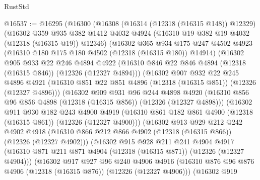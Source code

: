 \begin{lexlean}{RustStd}
\begin{coremodule}
@16537 := @16295
    (@16300
      (@16308
        (@16314 (@12318 (@16315 @148)) @12329)
        (@16302
          @359
          @935
          @382
          @1412
          @4032
          @4924
          (@16310 @19 @382 @19 @4032 (@12318 (@16315 @19)) @12346)
          (@16302
            @365
            @934
            @175
            @247
            @4502
            @4923
            (@16310 @180 @175 @180 @4502 (@12318 (@16315 @180)) @14914)
            (@16302
              @905
              @933
              @22
              @246
              @4894
              @4922
              (@16310 @846 @22 @846 @4894 (@12318 (@16315 @846)) (@12326 (@12327 @4894)))
              (@16302
                @907
                @932
                @22
                @245
                @4896
                @4921
                (@16310 @851 @22 @851 @4896 (@12318 (@16315 @851)) (@12326 (@12327 @4896)))
                (@16302
                  @909
                  @931
                  @96
                  @244
                  @4898
                  @4920
                  (@16310 @856 @96 @856 @4898 (@12318 (@16315 @856)) (@12326 (@12327 @4898)))
                  (@16302
                    @911
                    @930
                    @182
                    @243
                    @4900
                    @4919
                    (@16310 @861 @182 @861 @4900 (@12318 (@16315 @861)) (@12326 (@12327 @4900)))
                    (@16302
                      @913
                      @929
                      @212
                      @242
                      @4902
                      @4918
                      (@16310 @866 @212 @866 @4902 (@12318 (@16315 @866)) (@12326 (@12327 @4902)))
                      (@16302
                        @915
                        @928
                        @211
                        @241
                        @4904
                        @4917
                        (@16310 @871 @211 @871 @4904 (@12318 (@16315 @871)) (@12326 (@12327 @4904)))
                        (@16302
                          @917
                          @927
                          @96
                          @240
                          @4906
                          @4916
                          (@16310
                            @876
                            @96
                            @876
                            @4906
                            (@12318 (@16315 @876))
                            (@12326 (@12327 @4906)))
                          (@16302
                            @919

\end{coremodule}
\end{lexlean}
